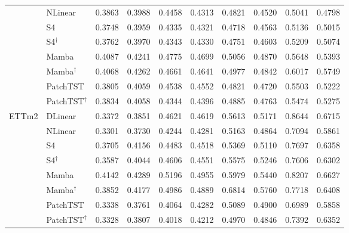 \begin{tabular}{llcccccccc}
 & NLinear & 0.3863 & 0.3988 & 0.4458 & 0.4313 & 0.4821 & 0.4520 & 0.5041 & 0.4798 \\
 & S4 & 0.3748 & 0.3959 & 0.4335 & 0.4321 & 0.4718 & 0.4563 & 0.5136 & 0.5015 \\
 & S4$^\dagger$ & 0.3762 & 0.3970 & 0.4343 & 0.4330 & 0.4751 & 0.4603 & 0.5209 & 0.5074 \\
 & Mamba & 0.4087 & 0.4241 & 0.4775 & 0.4699 & 0.5056 & 0.4870 & 0.5648 & 0.5393 \\
 & Mamba$^\dagger$ & 0.4068 & 0.4262 & 0.4661 & 0.4641 & 0.4977 & 0.4842 & 0.6017 & 0.5749 \\
 & PatchTST & 0.3805 & 0.4059 & 0.4538 & 0.4552 & 0.4821 & 0.4720 & 0.5503 & 0.5222 \\
 & PatchTST$^\dagger$ & 0.3834 & 0.4058 & 0.4344 & 0.4396 & 0.4885 & 0.4763 & 0.5474 & 0.5275 \\
\midrule
\multirow{8}{*}{ETTm2} & DLinear & 0.3372 & 0.3851 & 0.4621 & 0.4619 & 0.5613 & 0.5171 & 0.8644 & 0.6715 \\
 & NLinear & 0.3301 & 0.3730 & 0.4244 & 0.4281 & 0.5163 & 0.4864 & 0.7094 & 0.5861 \\
 & S4 & 0.3705 & 0.4156 & 0.4483 & 0.4518 & 0.5369 & 0.5110 & 0.7697 & 0.6358 \\
 & S4$^\dagger$ & 0.3587 & 0.4044 & 0.4606 & 0.4551 & 0.5575 & 0.5246 & 0.7606 & 0.6302 \\
 & Mamba & 0.4142 & 0.4289 & 0.5196 & 0.4955 & 0.5979 & 0.5440 & 0.8207 & 0.6627 \\
 & Mamba$^\dagger$ & 0.3852 & 0.4177 & 0.4986 & 0.4889 & 0.6814 & 0.5760 & 0.7718 & 0.6408 \\
 & PatchTST & 0.3338 & 0.3761 & 0.4064 & 0.4282 & 0.5089 & 0.4900 & 0.6989 & 0.5858 \\
 & PatchTST$^\dagger$ & 0.3328 & 0.3807 & 0.4018 & 0.4212 & 0.4970 & 0.4846 & 0.7392 & 0.6352 \\
\bottomrule
\end{tabular}